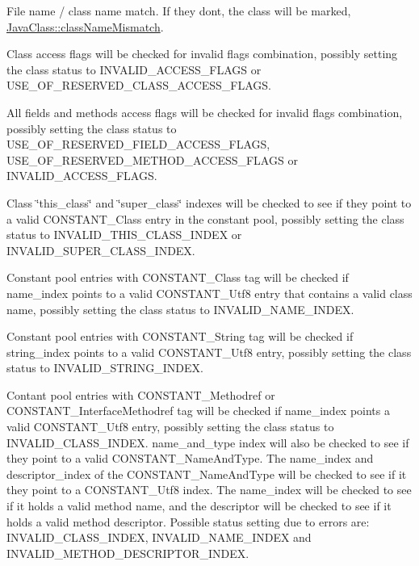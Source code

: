 \begin{DoxyItemize}
\item File name / class name match. If they don\textquotesingle{}t, the class will be marked, \hyperlink{structJavaClass_ae51618e3eb35bfce4a1267d57a686259}{Java\+Class\+::class\+Name\+Mismatch}.
\item Class access flags will be checked for invalid flags combination, possibly setting the class status to I\+N\+V\+A\+L\+I\+D\+\_\+\+A\+C\+C\+E\+S\+S\+\_\+\+F\+L\+A\+GS or U\+S\+E\+\_\+\+O\+F\+\_\+\+R\+E\+S\+E\+R\+V\+E\+D\+\_\+\+C\+L\+A\+S\+S\+\_\+\+A\+C\+C\+E\+S\+S\+\_\+\+F\+L\+A\+GS.
\item All fields and methods access flags will be checked for invalid flags combination, possibly setting the class status to U\+S\+E\+\_\+\+O\+F\+\_\+\+R\+E\+S\+E\+R\+V\+E\+D\+\_\+\+F\+I\+E\+L\+D\+\_\+\+A\+C\+C\+E\+S\+S\+\_\+\+F\+L\+A\+GS, U\+S\+E\+\_\+\+O\+F\+\_\+\+R\+E\+S\+E\+R\+V\+E\+D\+\_\+\+M\+E\+T\+H\+O\+D\+\_\+\+A\+C\+C\+E\+S\+S\+\_\+\+F\+L\+A\+GS or I\+N\+V\+A\+L\+I\+D\+\_\+\+A\+C\+C\+E\+S\+S\+\_\+\+F\+L\+A\+GS.
\item Class \char`\"{}this\+\_\+class\char`\"{} and \char`\"{}super\+\_\+class\char`\"{} indexes will be checked to see if they point to a valid C\+O\+N\+S\+T\+A\+N\+T\+\_\+\+Class entry in the constant pool, possibly setting the class status to I\+N\+V\+A\+L\+I\+D\+\_\+\+T\+H\+I\+S\+\_\+\+C\+L\+A\+S\+S\+\_\+\+I\+N\+D\+EX or I\+N\+V\+A\+L\+I\+D\+\_\+\+S\+U\+P\+E\+R\+\_\+\+C\+L\+A\+S\+S\+\_\+\+I\+N\+D\+EX.
\item Constant pool entries with C\+O\+N\+S\+T\+A\+N\+T\+\_\+\+Class tag will be checked if name\+\_\+index points to a valid C\+O\+N\+S\+T\+A\+N\+T\+\_\+\+Utf8 entry that contains a valid class name, possibly setting the class status to I\+N\+V\+A\+L\+I\+D\+\_\+\+N\+A\+M\+E\+\_\+\+I\+N\+D\+EX.
\item Constant pool entries with C\+O\+N\+S\+T\+A\+N\+T\+\_\+\+String tag will be checked if string\+\_\+index points to a valid C\+O\+N\+S\+T\+A\+N\+T\+\_\+\+Utf8 entry, possibly setting the class status to I\+N\+V\+A\+L\+I\+D\+\_\+\+S\+T\+R\+I\+N\+G\+\_\+\+I\+N\+D\+EX.
\item Contant pool entries with C\+O\+N\+S\+T\+A\+N\+T\+\_\+\+Methodref or C\+O\+N\+S\+T\+A\+N\+T\+\_\+\+Interface\+Methodref tag will be checked if name\+\_\+index points a valid C\+O\+N\+S\+T\+A\+N\+T\+\_\+\+Utf8 entry, possibly setting the class status to I\+N\+V\+A\+L\+I\+D\+\_\+\+C\+L\+A\+S\+S\+\_\+\+I\+N\+D\+EX. name\+\_\+and\+\_\+type index will also be checked to see if they point to a valid C\+O\+N\+S\+T\+A\+N\+T\+\_\+\+Name\+And\+Type. The name\+\_\+index and descriptor\+\_\+index of the C\+O\+N\+S\+T\+A\+N\+T\+\_\+\+Name\+And\+Type will be checked to see if it they point to a C\+O\+N\+S\+T\+A\+N\+T\+\_\+\+Utf8 index. The name\+\_\+index will be checked to see if it holds a valid method name, and the descriptor will be checked to see if it holds a valid method descriptor. Possible status setting due to errors are\+: I\+N\+V\+A\+L\+I\+D\+\_\+\+C\+L\+A\+S\+S\+\_\+\+I\+N\+D\+EX, I\+N\+V\+A\+L\+I\+D\+\_\+\+N\+A\+M\+E\+\_\+\+I\+N\+D\+EX and I\+N\+V\+A\+L\+I\+D\+\_\+\+M\+E\+T\+H\+O\+D\+\_\+\+D\+E\+S\+C\+R\+I\+P\+T\+O\+R\+\_\+\+I\+N\+D\+EX.

\end{DoxyItemize}

